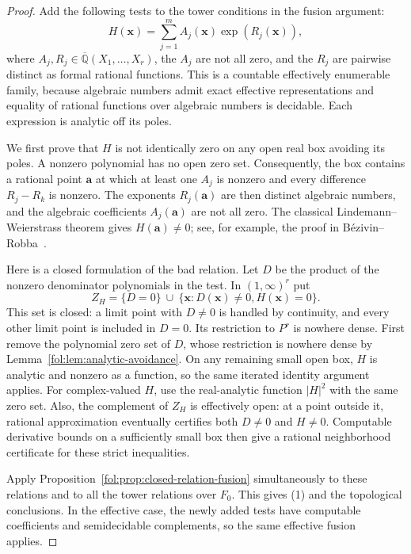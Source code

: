 \documentclass[11pt,a4paper]{article}
\theoremstyle{definition}
\theoremstyle{remark}
\numberwithin{equation}{section}
\begin{document}
\begin{proof}
Add the following tests to the tower conditions in the fusion argument:
\begin{equation}
\label{fol:eq:field-exponential-tests}
 H(\mathbf x)=\sum_{j=1}^m A_j(\mathbf x)
                          \exp(R_j(\mathbf x)),
\end{equation}
where $A_j,R_j\in\overline{\mathbb Q}(X_1,\ldots,X_r)$, the $A_j$
are not all zero, and the $R_j$ are pairwise distinct as formal rational
functions.  This is a countable effectively enumerable family, because
algebraic numbers admit exact effective representations and equality
of rational functions over algebraic numbers is decidable.
Each expression is analytic off its poles.

We first prove that $H$ is not identically zero on any open real box
avoiding its poles.  A nonzero polynomial has no open zero set.
Consequently, the box contains a rational point $\mathbf a$ at which
at least one $A_j$ is nonzero and every difference $R_j-R_k$ is nonzero.
The exponents $R_j(\mathbf a)$ are then distinct algebraic numbers,
and the algebraic coefficients $A_j(\mathbf a)$ are not all zero.
The classical Lindemann--Weierstrass theorem gives $H(\mathbf a)\ne0$;
see, for example, the proof in B\'ezivin--Robba~\cite{BezivinRobba1989}.

Here is a closed formulation of the bad relation.  Let $D$ be the product
of the nonzero denominator polynomials in the test.  In $(1,\infty)^r$
put
\[
 Z_H=\{D=0\}\ \cup\ \{\mathbf x:D(\mathbf x)\ne0,
                                      H(\mathbf x)=0\}.
\]
This set is closed: a limit point with $D\ne0$ is handled by continuity,
and every other limit point is included in $D=0$.
Its restriction to $P^r$ is nowhere dense.  First remove the polynomial
zero set of $D$, whose restriction is nowhere dense by
Lemma~\ref{fol:lem:analytic-avoidance}.  On any remaining small open box,
$H$ is analytic and nonzero as a function, so the same iterated identity
argument applies.  For complex-valued $H$, use the real-analytic
function $|H|^2$ with the same zero set.
Also, the complement of $Z_H$ is effectively open: at a point outside
it, rational approximation eventually certifies both $D\ne0$ and
$H\ne0$. Computable derivative bounds on a sufficiently small box
then give a rational neighborhood certificate for these strict inequalities.

Apply Proposition~\ref{fol:prop:closed-relation-fusion} simultaneously to
these relations and to all the tower relations over $F_0$.
This gives (1) and the topological conclusions.  In the effective case,
the newly added tests have computable coefficients and semidecidable
complements, so the same effective fusion applies.


\end{proof}
\end{document}

